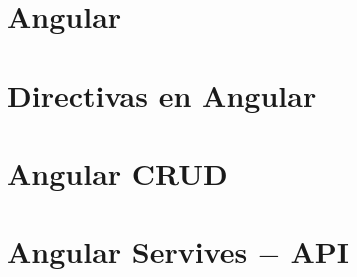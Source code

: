 \section{Angular}



\section{Directivas en Angular}


\section{Angular CRUD}


\section{Angular Servives $-$ API}
